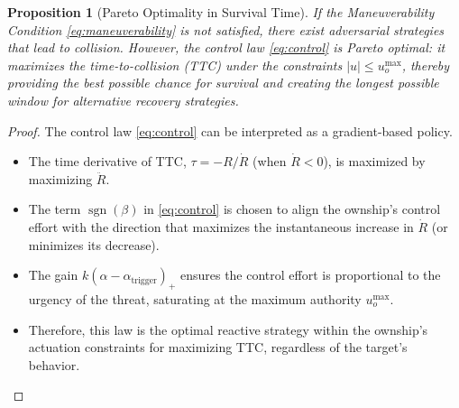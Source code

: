 \documentclass[10pt]{article}
\DeclareMathOperator{\sgn}{sgn}
\theoremstyle{plain}
\newtheorem{proposition}[theorem]{Proposition}
\begin{document}
\begin{proposition}[Pareto Optimality in Survival Time]\label{prop:optimality}
    If the Maneuverability Condition \eqref{eq:maneuverability} is not satisfied, there exist adversarial strategies that lead to collision. However, the control law \eqref{eq:control} is Pareto optimal: it maximizes the time-to-collision (TTC) under the constraints $|u| \leq u_o^{\max}$, thereby providing the best possible chance for survival and creating the longest possible window for alternative recovery strategies.
\end{proposition}

\begin{proof}
    The control law \eqref{eq:control} can be interpreted as a gradient-based policy.
    \begin{itemize}
        \item The time derivative of TTC, $\tau = -R / \dot{R}$ (when $\dot{R} < 0$), is maximized by maximizing $\ddot{R}$.
        \item The term $\sgn(\beta)$ in \eqref{eq:control} is chosen to align the ownship's control effort with the direction that maximizes the instantaneous increase in $\dot{R}$ (or minimizes its decrease).
        \item The gain $k(\alpha - \alpha_{\text{trigger}})_+$ ensures the control effort is proportional to the urgency of the threat, saturating at the maximum authority $u_o^{\max}$.
        \item Therefore, this law is the optimal reactive strategy within the ownship's actuation constraints for maximizing TTC, regardless of the target's behavior.
    \end{itemize}
\end{proof}
\end{document}

